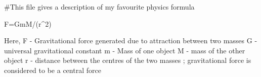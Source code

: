 #This file gives a description of my favourite physics formula

F=GmM/(r^2)

Here,
F - Gravitational force generated due to attraction between two masses
G - universal gravitational constant
m - Mass of one object
M - mass of the other object
r - distance between the centres of the two masses ; gravitational force is considered to be a central force


